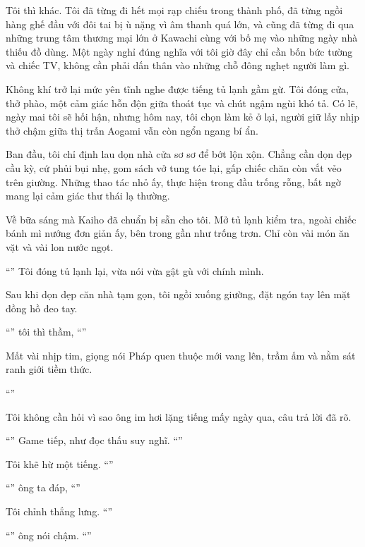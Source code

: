 \documentclass[../main.tex]{subfiles}
\begin{document}
Tôi thì khác. Tôi đã từng đi hết mọi rạp chiếu trong thành phố, đã từng ngồi hàng ghế đầu với đôi tai bị ù nặng vì âm thanh quá lớn, và cũng đã từng đi qua những trung tâm thương mại lớn ở Kawachi cùng với bố mẹ vào những ngày nhà thiếu đồ dùng. Một ngày nghỉ đúng nghĩa với tôi giờ đây chỉ cần bốn bức tường và chiếc TV, không cần phải dấn thân vào những chỗ đông nghẹt người làm gì.

Không khí trở lại mức yên tĩnh nghe được tiếng tủ lạnh gầm gừ. Tôi đóng cửa, thở phào, một cảm giác hỗn độn giữa thoát tục và chút ngậm ngùi khó tả. Có lẽ, ngày mai tôi sẽ hối hận, nhưng hôm nay, tôi chọn làm kẻ ở lại, người giữ lấy nhịp thở chậm giữa thị trấn Aogami vẫn còn ngổn ngang bí ẩn.

\ct

Ban đầu, tôi chỉ định lau dọn nhà cửa sơ sơ để bớt lộn xộn. Chẳng cần dọn dẹp cầu kỳ, cứ phủi bụi nhẹ, gom sách vở tung tóe lại, gấp chiếc chăn còn vắt vẻo trên giường. Những thao tác nhỏ ấy, thực hiện trong đầu trống rỗng, bất ngờ mang lại cảm giác thư thái lạ thường.

Về bữa sáng mà Kaiho đã chuẩn bị sẵn cho tôi. Mở tủ lạnh kiểm tra, ngoài chiếc bánh mì nướng đơn giản ấy, bên trong gần như trống trơn. Chỉ còn vài món ăn vặt và vài lon nước ngọt.

``'' Tôi đóng tủ lạnh lại, vừa nói vừa gật gù với chính mình.

Sau khi dọn dẹp căn nhà tạm gọn, tôi ngồi xuống giường, đặt ngón tay lên mặt đồng hồ đeo tay.

``'' tôi thì thầm, ``''

Mất vài nhịp tim, giọng nói Pháp quen thuộc mới vang lên, trầm ấm và nằm sát ranh giới tiềm thức.

``''

Tôi không cần hỏi vì sao ông im hơi lặng tiếng mấy ngày qua, câu trả lời đã rõ.

``'' Game tiếp, như đọc thấu suy nghĩ. ``''

Tôi khẽ hừ một tiếng. ``''

``'' ông ta đáp, ``''

Tôi chỉnh thẳng lưng. ``''

``'' ông nói chậm. ``''
\end{document}
